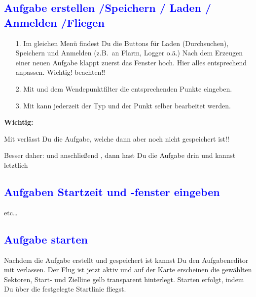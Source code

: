 \bc\sk\blink{}\blink{}\ec

\subsection*{\textcolor{blue}{Aufgabe erstellen /Speichern / Laden / Anmelden /Fliegen}}

\bc{}\blink{}\blink{}\ec
\begin{itemize}
\item[1.]Im gleichen Menü findest Du die Buttons für Laden (Durchsuchen), Speichern
und Anmelden (z.B.\ an Flarm, Logger  o.ä.) Nach dem Erzeugen einer neuen Aufgabe klappt zuerst das Fenster  hoch.
Hier alles entsprechend anpassen. Wichtig!  beachten!!
\item[2.] Mit \blink{} und dem
Wendepunktfilter die entsprechenden Punkte eingeben.
 \item[3.] Mit  kann jederzeit der Typ und der Punkt selber
 bearbeitet werden.
\end{itemize}
\textbf{Wichtig:}

Mit  verlässt Du die Aufgabe, welche dann aber {\textsf noch nicht} gespeichert ist!!

Besser daher:  und anschließend , dann hast Du die Aufgabe drin
und kannst letztlich 


\subsection*{\textcolor{blue}{Aufgaben  Startzeit und -fenster eingeben}}
\bc{}\blink{}\blink{} etc\dots\ec
\subsection*{\textcolor{blue}{Aufgabe starten}}
Nachdem die Aufgabe erstellt und  gespeichert ist kannst Du den Aufgabeneditor mit  verlassen.
Der Flug ist jetzt aktiv und auf der Karte erscheinen die gewählten Sektoren, Start- und Zielline gelb transparent hinterlegt.
Starten erfolgt, indem Du über die festgelegte Startlinie fliegst.

